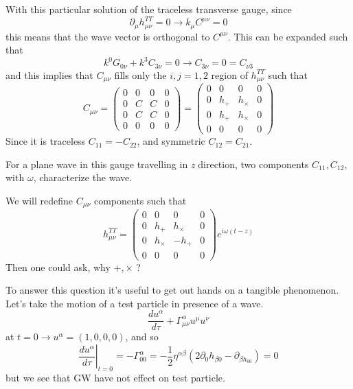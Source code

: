 With this particular solution of the traceless transverse gauge, since 
\[
\partial_{\mu }h^{TT}_{\mu \nu } = 0 \to k_{\mu }C^{\mu \nu } = 0
\]
this means that the wave vector is orthogonal to $C^{\mu \nu }$. This can be expanded such that 
\[
k^{0}G_{0\nu } + k^{3}C_{3\nu } = 0 \to  C_{3\nu } = 0 = C_{\nu  3}
\]
and this implies that $C_{\mu \nu }$ fills only the $i,j = 1,2$ region of $h^{TT}_{\mu \nu }$ such that
\[
C_{\mu \nu } = \begin{pmatrix}
0 & 0 & 0 & 0 \\
0 & C & C & 0 \\
0 & C & C & 0 \\
0 & 0 & 0 & 0
\end{pmatrix} = \begin{pmatrix}
0 & 0 & 0 & 0 \\
0 & h_{+} & h_{\times} & 0 \\
0 & h_{+} & h_{\times} & 0 \\
0 & 0 & 0 & 0
\end{pmatrix} 
\]
Since it is traceless $C_{11} = -C_{22}$, and symmetric $C_{12} = C_{21}$.\par
For a plane wave in this gauge travelling in \emph{z} direction, two components $C_{11}, C_{12}$, with $\omega $, characterize the wave.

We will redefine $C_{\mu \nu }$ components such that
\[
h_{\mu \nu  }^{TT}= \begin{pmatrix}
0 & 0 & 0 & 0 \\
0 & h_{+} & h_{\times} & 0 \\
0 & h_{\times} & -h_{+} & 0 \\
0 & 0 & 0 & 0
\end{pmatrix} e^{i \omega \left( t-z \right)}
\]
Then one could ask, why $+, \times$ ? \par
To answer this question it's useful to get out hands on a tangible phenomenon. Let's take the motion of a test particle in presence of a wave. 
\[
\frac{d u^{\alpha }}{d \tau } + \Gamma ^{\alpha }_{\mu \nu }u^{\mu }u^{\nu }
\]
at $t=0 \to u^{\alpha }= \left( 1,0,0,0 \right)$, and so
\[
 \left.\frac{d u^{\alpha }}{d \tau }\right|_{t=0} = - \Gamma ^{\alpha }_{00} = -\frac{1}{2}\eta ^{\alpha \beta }\left( 2\partial_{0}h_{\beta 0}-\partial_{\beta h_{00}} \right) =0
\]
but we see that GW have not effect on test particle.\par

